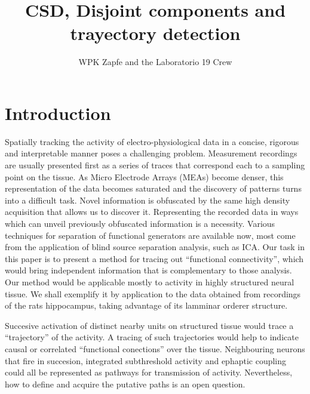 \documentclass{article}
\author{WPK Zapfe and the Laboratorio 19 Crew}
\title{CSD, Disjoint components and trayectory detection}
\begin{document}
\maketitle

\section{Introduction}

Spatially tracking the activity of electro-physiological data in a concise, rigorous and interpretable manner poses a challenging problem. Measurement recordings are usually presented first as a series of traces that correspond each to a sampling point on the tissue. As Micro Electrode Arrays (MEAs) become denser, this representation of the data becomes saturated and the discovery of patterns turns into a difficult task. Novel information is obfuscated by the same high density acquisition that allows us to discover it. Representing  the recorded data in ways which can unveil previously obfuscated information is a necessity. Various techniques for separation of functional generators are available now, most come from the application of blind source separation analysis, such as ICA. 
Our task in this paper is to present a method for tracing out ``functional connectivity'', which would bring independent information that is complementary to those analysis.  Our  method would be applicable mostly to activity in highly structured neural tissue. We shall exemplify it by application to the data obtained from recordings of the rats hippocampus, taking advantage of its lamminar
orderer structure. 

Succesive activation  of distinct nearby units on structured tissue would trace a ``trajectory'' of the activity. A tracing of such trajectories would help to indicate causal or correlated ``functional conections'' over the tissue. Neighbouring neurons that fire in succesion, integrated subthreshold activity and ephaptic coupling could all be represented as pathways for transmission of activity. Nevertheless, how to define and acquire the putative paths is an open question.
\end{document}

